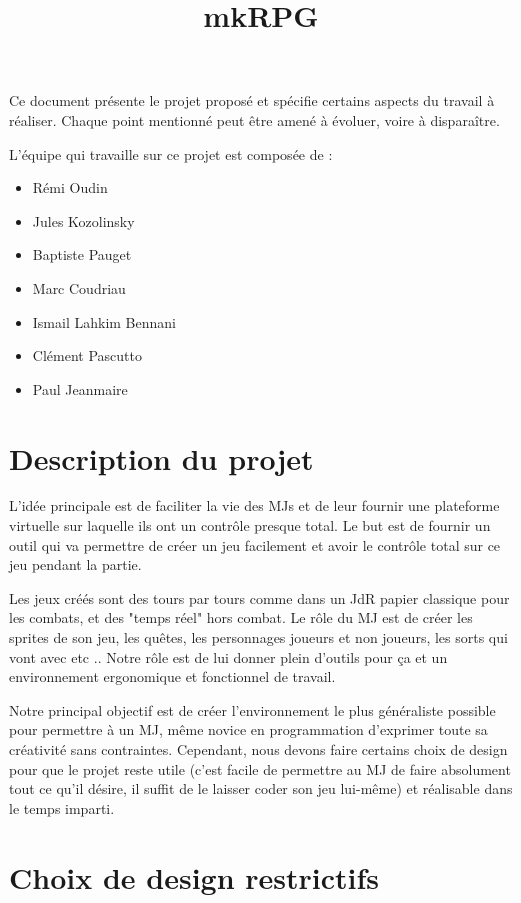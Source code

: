 \documentclass[a4paper]{article}
\title{mkRPG}
\date{}
\begin{document}
	\maketitle
	
	Ce document présente le projet proposé et spécifie certains aspects du travail à réaliser. Chaque point mentionné peut être amené à évoluer, voire à disparaître.
	
	L'équipe qui travaille sur ce projet est composée de :
	\begin{itemize}
		\item Rémi Oudin
		\item Jules Kozolinsky
		\item Baptiste Pauget
		\item Marc Coudriau
		\item Ismail Lahkim Bennani
		\item Clément Pascutto
		\item Paul Jeanmaire
	\end{itemize}
	
	\section{Description du projet}
	
	L'idée principale est de faciliter la vie des MJs et de leur fournir une plateforme virtuelle sur laquelle ils ont un contrôle presque total. Le but est de fournir un outil qui va permettre de créer un jeu facilement et avoir le contrôle total sur ce jeu pendant la partie.
	
	Les jeux créés sont des tours par tours comme dans un JdR papier classique pour les combats, et des "temps réel" hors combat. Le rôle du MJ est de créer les sprites de son jeu, les quêtes, les personnages joueurs et non joueurs, les sorts qui vont avec etc .. Notre rôle est de lui donner plein d'outils pour ça et un environnement ergonomique et fonctionnel de travail. 
	
	Notre principal objectif est de créer l'environnement le plus généraliste possible pour permettre à un MJ, même novice en programmation d'exprimer toute sa créativité sans contraintes. Cependant, nous devons faire certains choix de design pour que le projet reste utile (c'est facile de permettre au MJ de faire absolument tout ce qu'il désire, il suffit de le laisser coder son jeu lui-même) et réalisable dans le temps imparti.

	\section{Choix de design restrictifs}
\end{document}
